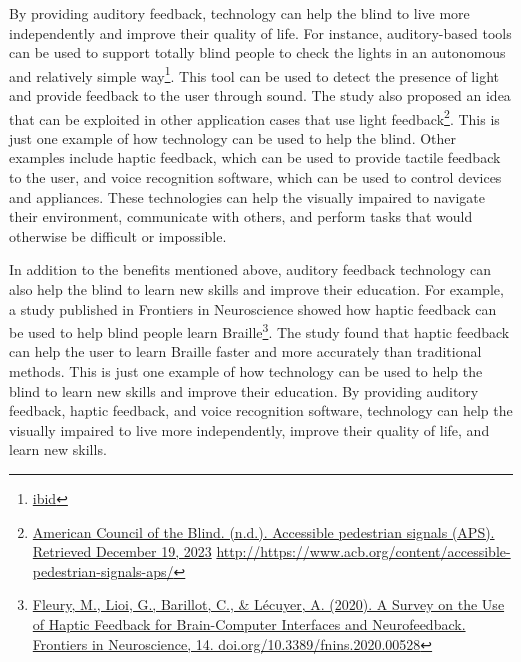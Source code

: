 \documentclass[12pt,letterpaper,twoside,openright]{report}
\begin{document}
By providing auditory feedback, technology can help the blind to live more independently and improve their quality of life. For instance, auditory-based tools can be used to support totally blind people to check the lights in an autonomous and relatively simple way\footnote{\raggedright \href{http://link.springer.com/article/10.1007/s12652-020-01944-w}{ibid}}. This tool can be used to detect the presence of light and provide feedback to the user through sound. The study also proposed an idea that can be exploited in other application cases that use light feedback\footnote{\raggedright \href{http://https://www.acb.org/content/accessible-pedestrian-signals-aps/}{American Council of the Blind. (n.d.). Accessible pedestrian signals (APS). Retrieved December 19, 2023} \url{http://https://www.acb.org/content/accessible-pedestrian-signals-aps/}}. This is just one example of how technology can be used to help the blind. Other examples include haptic feedback, which can be used to provide tactile feedback to the user, and voice recognition software, which can be used to control devices and appliances. These technologies can help the visually impaired to navigate their environment, communicate with others, and perform tasks that would otherwise be difficult or impossible.

In addition to the benefits mentioned above, auditory feedback technology can also help the blind to learn new skills and improve their education. For example, a study published in Frontiers in Neuroscience showed how haptic feedback can be used to help blind people learn Braille\footnote{\raggedright \href{http://www.frontiersin.org/articles/10.3389/fnins.2020.00528/full}{Fleury, M., Lioi, G., Barillot, C., \& Lécuyer, A. (2020). A Survey on the Use of Haptic Feedback for Brain-Computer Interfaces and Neurofeedback. Frontiers in Neuroscience, 14. doi.org/10.3389/fnins.2020.00528}}. The study found that haptic feedback can help the user to learn Braille faster and more accurately than traditional methods. This is just one example of how technology can be used to help the blind to learn new skills and improve their education. By providing auditory feedback, haptic feedback, and voice recognition software, technology can help the visually impaired to live more independently, improve their quality of life, and learn new skills.
\end{document}
